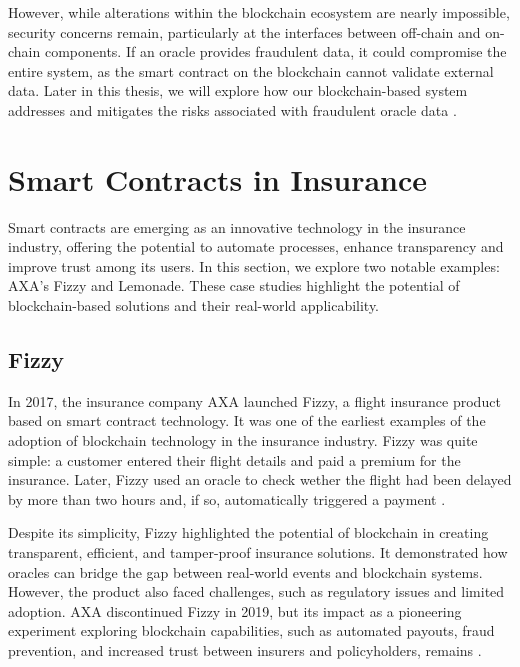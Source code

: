 However, while alterations within the blockchain ecosystem are nearly impossible, security concerns remain, particularly at the interfaces between off-chain and on-chain components. If an oracle provides fraudulent data, it could compromise the entire system, as the smart contract on the blockchain cannot validate external data. Later in this thesis, we will explore how our blockchain-based system addresses and mitigates the risks associated with fraudulent oracle data \autocite{Khan2022Investigation}.

\section{Smart Contracts in Insurance}\label{section:smart_contracts_insurance}
Smart contracts are emerging as an innovative technology in the insurance industry, offering the potential to automate processes, enhance transparency and improve trust among its users. In this section, we explore two notable examples: AXA's Fizzy and Lemonade. These case studies highlight the potential of blockchain-based solutions and their real-world applicability.

\subsection{Fizzy}
In 2017, the insurance company AXA launched Fizzy, a flight insurance product based on smart contract technology. It was one of the earliest examples of the adoption of blockchain technology in the insurance industry. Fizzy was quite simple: a customer entered their flight details and paid a premium for the insurance. Later, Fizzy used an oracle to check wether the flight had been delayed by more than two hours and, if so, automatically triggered a payment \autocite{hoffmann2021double}.

Despite its simplicity, Fizzy highlighted the potential of blockchain in creating transparent, efficient, and tamper-proof insurance solutions. It demonstrated how oracles can bridge the gap between real-world events and blockchain systems. However, the product also faced challenges, such as regulatory issues and limited adoption. AXA discontinued Fizzy in 2019, but its impact as a pioneering experiment exploring blockchain capabilities, such as automated payouts, fraud prevention, and increased trust between insurers and policyholders, remains \autocite{sedkaoui2021blockchain}.

